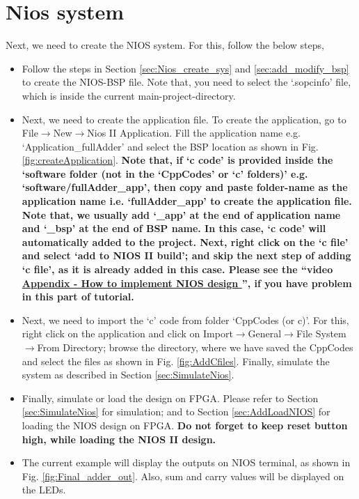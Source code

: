 \section{Nios system} \label{sec:nios_again_implement}

Next, we need to create the NIOS system. For this, follow the below steps, 
\begin{itemize}
	\item Follow the steps in Section \ref{sec:Nios_create_sys} and \ref{sec:add_modify_bsp} to create the NIOS-BSP file. Note that, you need to select the `.sopcinfo' file, which is inside the current main-project-directory.  

	\item Next, we need to create the application file. To create the application, go to File$\rightarrow$New$\rightarrow$Nios II Application. Fill the application name e.g. `Application\_fullAdder' and select the BSP location as shown in Fig. \ref{fig:createApplication}. \textbf{Note that, if `c code' is provided inside the `software folder (not in the `CppCodes' or `c' folders)' e.g. `software/fullAdder\_app', then copy and paste folder-name as the application name i.e. `fullAdder\_app' to create the application file. Note that, we usually add `\_app' at the end of application name and `\_bsp' at the end of BSP name. In this case, `c code' will automatically added to the project. Next, right click on the `c file' and select `add to NIOS II build'; and skip the next step of adding `c file', as it is already added in this case. Please see the ``video \href{https://www.youtube.com/playlist?list=PLpqu8JfoNKiNJpFvKTeBlI-LMzc2TAlRM}{Appendix - How to implement NIOS design }'', if you have problem in this part of tutorial.}
	

	\item Next, we need to import the `c' code from folder `CppCodes (or c)'. For this, right click on the application and click on Import$\rightarrow$General$\rightarrow$File System$\rightarrow$From Directory; browse the directory, where we have saved  the CppCodes  and select the files as shown in Fig. \ref{fig:AddCfiles}. Finally, simulate the system as described in Section \ref{sec:SimulateNios}.
	
	\item Finally, simulate or load the design on FPGA. Please refer to Section \ref{sec:SimulateNios} for simulation; and to Section \ref{sec:AddLoadNIOS} for loading the NIOS design on FPGA. \textbf{Do not forget to keep reset button high, while loading the NIOS II design.} 
	
	\item The current example will display the outputs on NIOS terminal, as shown in Fig. \ref{fig:Final_adder_out}. Also, sum and carry values will be displayed on the LEDs.  
	
	
\end{itemize}

